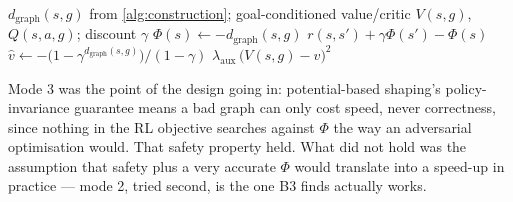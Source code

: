 \documentclass[11pt]{article}
\newcommand{\dgraph}{d_{\mathrm{graph}}}
\begin{document}
\begin{algorithm}[H]
\caption{Consuming $\dgraph$ in offline RL --- two modes tested, in trial order}
\label{alg:consumption}
\begin{algorithmic}[1]
\Require $\dgraph(s,g)$ from \cref{alg:construction}; goal-conditioned value/critic $V(s,g)$, $Q(s,a,g)$; discount $\gamma$
 
    \State $\Phi(s) \gets -\dgraph(s,g)$
    \Return $r(s,s') + \gamma\Phi(s') - \Phi(s)$ 
\EndProcedure
{} 
    \State $\hat v \gets -\bigl(1-\gamma^{\dgraph(s,g)}\bigr)/(1-\gamma)$ 
    \Return $\lambda_{\text{aux}}\,\bigl(V(s,g) - \hat v\bigr)^2$ 
\EndProcedure
\end{algorithmic}
\end{algorithm}

Mode 3 was the point of the design going in: potential-based shaping's policy-invariance guarantee
means a bad graph can only cost speed, never correctness, since nothing in the RL objective
searches against $\Phi$ the way an adversarial optimisation would. That safety property held. What
did not hold was the assumption that safety plus a very accurate $\Phi$ would translate into a
speed-up in practice --- mode 2, tried second, is the one B3 finds actually works.
\end{document}
